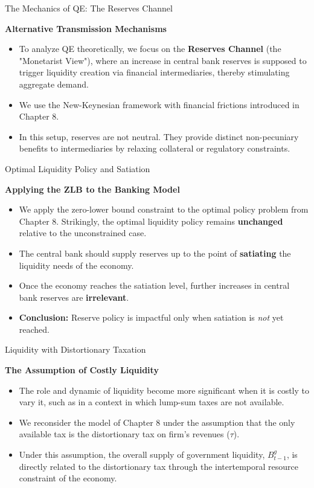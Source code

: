 \documentclass[11pt,aspectratio=169]{beamer}
\begin{document}
\begin{frame}{The Mechanics of QE: The Reserves Channel}
\small

\textbf{Alternative Transmission Mechanisms}
\begin{itemize}
    \item To analyze QE theoretically, we focus on the \textbf{Reserves Channel} (the "Monetarist View"), where an increase in central bank  reserves is supposed to trigger liquidity creation via financial intermediaries, thereby stimulating aggregate demand.
    \item We use the New-Keynesian framework with financial frictions introduced in Chapter 8.
    \item In this setup, reserves are not neutral. They provide distinct non-pecuniary benefits to intermediaries by relaxing collateral or regulatory constraints.
\end{itemize}
\end{frame}
\begin{frame}{Optimal Liquidity Policy and Satiation}
\small

\textbf{Applying the ZLB to the Banking Model}
\begin{itemize}
    \item We apply the zero-lower bound constraint to the optimal policy problem from Chapter 8. Strikingly, the optimal liquidity policy remains \textbf{unchanged} relative to the unconstrained case. 
    \item The central bank  should supply reserves up to the point of \textbf{satiating} the liquidity needs of the economy.
    \item Once the economy reaches the satiation level, further increases in central bank  reserves are \textbf{irrelevant}.
    \item \textbf{Conclusion:} Reserve policy is impactful only when satiation is \textit{not} yet reached.
\end{itemize}
\end{frame}

\begin{frame}{Liquidity with Distortionary Taxation}
\small

\textbf{The Assumption of Costly Liquidity}
\begin{itemize}
    \item The role and dynamic of liquidity become more significant when it is costly to vary it, such as in a context in which lump-sum taxes are not available.
    \item We reconsider the model of Chapter 8 under the assumption that the only available tax is the distortionary tax on firm's revenues ($\tau$).
    \item Under this assumption, the overall supply of government liquidity, $B_{t-1}^{g}$, is directly related to the distortionary tax through the intertemporal resource constraint of the economy.
\end{itemize}
\end{frame}
\end{document}
